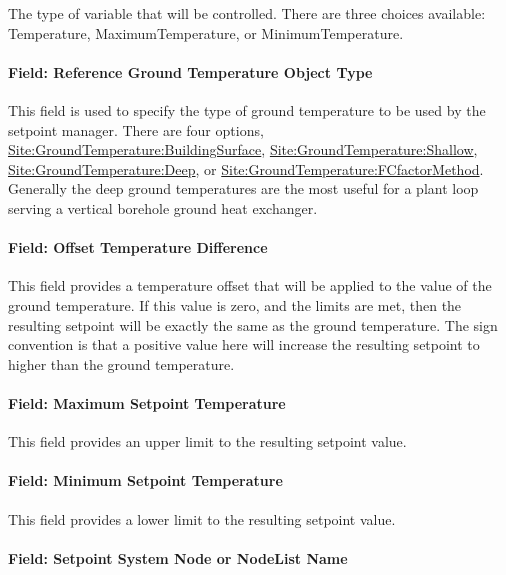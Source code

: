 The type of variable that will be controlled. There are three choices available: Temperature, MaximumTemperature, or MinimumTemperature.

\paragraph{Field: Reference Ground Temperature Object Type}\label{field-reference-ground-temperature-object-type}

This field is used to specify the type of ground temperature to be used by the setpoint manager. There are four options, \hyperref[sitegroundtemperaturebuildingsurface]{Site:GroundTemperature:BuildingSurface}, \hyperref[sitegroundtemperatureshallow]{Site:GroundTemperature:Shallow}, \hyperref[sitegroundtemperaturedeep]{Site:GroundTemperature:Deep}, or \hyperref[sitegroundtemperaturefcfactormethod]{Site:GroundTemperature:FCfactorMethod}. Generally the deep ground temperatures are the most useful for a plant loop serving a vertical borehole ground heat exchanger.

\paragraph{Field: Offset Temperature Difference}\label{field-offset-temperature-difference-2}

This field provides a temperature offset that will be applied to the value of the ground temperature. If this value is zero, and the limits are met, then the resulting setpoint will be exactly the same as the ground temperature. The sign convention is that a positive value here will increase the resulting setpoint to higher than the ground temperature.

\paragraph{Field: Maximum Setpoint Temperature}\label{field-maximum-setpoint-temperature-7}

This field provides an upper limit to the resulting setpoint value.

\paragraph{Field: Minimum Setpoint Temperature}\label{field-minimum-setpoint-temperature-7}

This field provides a lower limit to the resulting setpoint value.

\paragraph{Field: Setpoint System Node or NodeList Name}\label{field-setpoint-system-node-or-nodelist-name-1}

